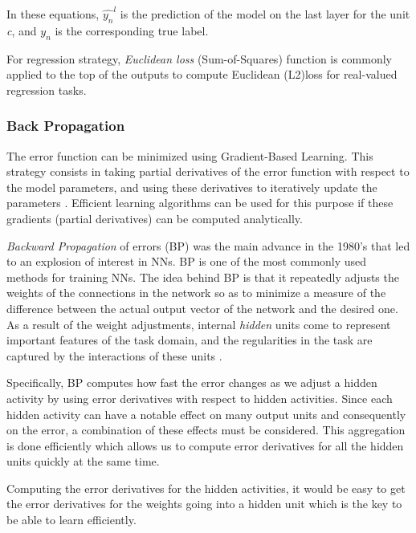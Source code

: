 In these equations, $\hat{y_n}^{l}$ is the prediction of the model on the last layer for the unit \textit{c}, and $y_n$  is the corresponding true label.

For regression strategy, \textit{Euclidean loss} (Sum-of-Squares) function is commonly applied to the top of the outputs to compute Euclidean (L2)loss for real-valued regression tasks.
 


\subsubsection{Back Propagation}
\label{subsec:bp}

The error function can be minimized using Gradient-Based Learning. This strategy consists in taking partial derivatives of the error function with respect to the model parameters, and using these derivatives to iteratively update the parameters \cite{lecun1998gradient}. Efficient learning algorithms can be used for this purpose if these gradients (partial derivatives) can be computed analytically.

\textit{Backward Propagation} of errors (BP) was the main advance in the 1980's that led to an explosion of interest in NNs. BP is one of the most commonly used methods for training NNs. The idea behind BP is that it repeatedly adjusts the weights of the connections in the network so as to minimize a measure of the difference between the actual output vector of the network and the desired one. As a result of the weight adjustments, internal \textit{hidden} units come to represent important features of the task domain, and the regularities in the task are captured by the interactions of these units \cite{williams1986learning}.

Specifically, BP computes how fast the error changes as we adjust a hidden activity by using error derivatives with respect to hidden activities. Since each hidden activity can have a notable effect on many output units and consequently on the error, a combination of these effects must be considered. This aggregation is done efficiently which allows us to compute error derivatives for all the hidden units quickly at the same time. 

\indent Computing the error derivatives for the hidden activities, it would be easy to get the error derivatives for the weights going into a hidden unit which is the key to be able to learn efficiently. 
%
%

